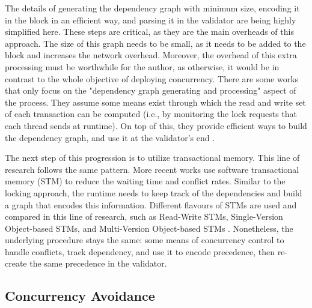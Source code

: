 The details of generating the dependency graph with minimum size, encoding it in the block in an
efficient way, and parsing it in the validator are being highly simplified here. These steps are
critical, as they are the main overheads of this approach. The size of this graph needs to be small,
as it needs to be added to the block and increases the network overhead. Moreover, the overhead of
this extra processing must be worthwhile for the author, as otherwise, it would be in contrast to
the whole objective of deploying concurrency. There are some works that only focus on the
"dependency graph generating and processing" aspect of the process. They assume some means exist
through which the read and write set of each transaction can be computed (i.e., by monitoring the
lock requests that each thread sends at runtime). On top of this, they provide efficient ways to
build the dependency graph, and use it at the validator's end \cite{EnablingConcurrencySmart2018}.

The next step of this progression is to utilize transactional memory. This line of research follows
the same pattern. More recent works use software transactional memory (STM) to reduce the waiting
time and conflict rates. Similar to the locking approach, the runtime needs to keep track of the
dependencies and build a graph that encodes this information. Different flavours of STMs are used
and compared in this line of research, such as Read-Write STMs, Single-Version Object-based STMs,
and Multi-Version Object-based STMs
\cite{anjanaEfficientConcurrentExecution2019,anjanaEfficientFrameworkOptimistic2019}. Nonetheless,
the underlying procedure stays the same: some means of concurrency control to handle conflicts,
track dependency, and use it to encode precedence, then re-create the same precedence in the
validator.

\subsection*{Concurrency Avoidance}


